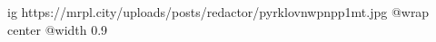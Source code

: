  
 
 
 
 

\ifcmt
  ig https://mrpl.city/uploads/posts/redactor/pyrklovnwpnpp1mt.jpg
  @wrap center
  @width 0.9
\fi
